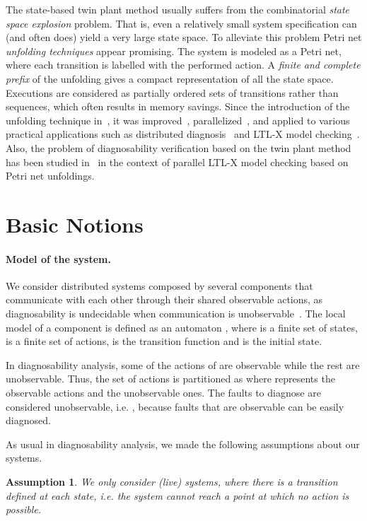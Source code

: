 \documentclass[a4paper]{article}
\newtheorem{assum}{Assumption}
\begin{document}
The state-based twin plant method usually suffers from the combinatorial \emph{state space explosion} problem. That is, even a relatively small system specification can (and often does) yield a very large state space. To alleviate this problem Petri net \emph{unfolding techniques} appear promising. The system is modeled as a Petri net, where each transition is labelled with the performed action. A \emph{finite and complete prefix} of the unfolding gives a compact representation of all the state space. Executions are considered as partially ordered sets of transitions rather than sequences, which often results in memory savings. Since the introduction of the unfolding technique in~\cite{McMillan1992a}, it was improved~\cite{Esparza2002}, parallelized~\cite{Heljanko2002}, and applied to various practical applications such as distributed diagnosis~\cite{Fabre2005a} and LTL-X model checking~\cite{EH-01}. Also, the problem of diagnosability verification based on the twin plant method has been studied in~\cite{Madalinski2010} in the context of parallel LTL-X model checking based on Petri net unfoldings.

\section{Basic Notions} \label{sec:DDES}

\paragraph{Model of the system.}
We consider distributed systems composed by several components that communicate with each other through their shared observable actions, as diagnosability is undecidable when communication is unobservable~\cite{YeDagueValid}. The local model of a component is defined as an automaton , where  is a finite set of states,  is a finite set of actions,  is the transition function and  is the initial state.

In diagnosability analysis, some of the actions of  are observable while the rest are unobservable. Thus, the set of actions  is partitioned as  where  represents the observable actions and  the unobservable ones. The faults to diagnose are considered unobservable, i.e. , because faults that are observable can be easily diagnosed.

As usual in diagnosability analysis, we made the following assumptions about our systems.

\begin{assum}
  We only consider (live) systems, where there is a transition defined at each state, i.e. the system cannot reach a point at which no action is possible.
\end{assum}
\end{document}
